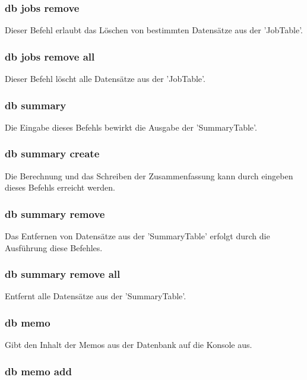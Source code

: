 \documentclass[12pt,a4paper]{report}
\begin{document}
\begin{onehalfspace}
\subsubsection{db jobs remove}

Dieser Befehl erlaubt das Löschen von bestimmten Datensätze aus der 'JobTable'.

\subsubsection{db jobs remove all}

Dieser Befehl löscht alle Datensätze aus der 'JobTable'.

\subsubsection{db summary}

Die Eingabe dieses Befehls bewirkt die Ausgabe der 'SummaryTable'.

\subsubsection{db summary create}

Die Berechnung und das Schreiben der Zusammenfassung kann durch eingeben dieses Befehls erreicht werden.

\subsubsection{db summary remove}

Das Entfernen von Datensätze aus der 'SummaryTable' erfolgt durch die Ausführung diese Befehles.

\subsubsection{db summary remove all}

Entfernt alle Datensätze aus der 'SummaryTable'.

\subsubsection{db memo}

Gibt den Inhalt der Memos aus der Datenbank auf die Konsole aus.

\subsubsection{db memo add}


\end{onehalfspace}
\end{document}
